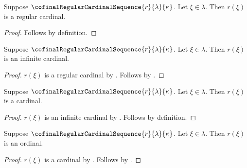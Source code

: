 \begin{proposition}\label{cofinal_regular_cardinal_sequence_value}
    Suppose $\cofinalRegularCardinalSequence{r}{\lambda}{\kappa}$.
    Let $\xi\in\lambda$.
    Then $r(\xi)$ is a regular cardinal.
\end{proposition}
\begin{proof}
    Follows by definition.
\end{proof}

\begin{proposition}\label{cofinal_regular_cardinal_sequence_value_is_infinite_cardinal}
    Suppose $\cofinalRegularCardinalSequence{r}{\lambda}{\kappa}$.
    Let $\xi\in\lambda$.
    Then $r(\xi)$ is an infinite cardinal.
\end{proposition}
\begin{proof}
    $r(\xi)$ is a regular cardinal by
        .
    Follows by .
\end{proof}

\begin{proposition}\label{cofinal_regular_cardinal_sequence_value_is_cardinal}
    Suppose $\cofinalRegularCardinalSequence{r}{\lambda}{\kappa}$.
    Let $\xi\in\lambda$.
    Then $r(\xi)$ is a cardinal.
\end{proposition}
\begin{proof}
    $r(\xi)$ is an infinite cardinal by
        .
    Follows by definition.
\end{proof}

\begin{proposition}\label{cofinal_regular_cardinal_sequence_value_is_ordinal}
    Suppose $\cofinalRegularCardinalSequence{r}{\lambda}{\kappa}$.
    Let $\xi\in\lambda$.
    Then $r(\xi)$ is an ordinal.
\end{proposition}
\begin{proof}
    $r(\xi)$ is a cardinal by
        .
    Follows by .
\end{proof}

